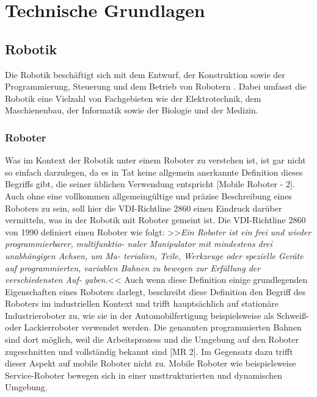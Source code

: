 \section{Technische Grundlagen}
\subsection{Robotik} %
\color{finishing}
Die Robotik beschäftigt sich mit dem Entwurf, der Konstruktion sowie der Programmierung, Steuerung und dem Betrieb 
von Robotern . Dabei umfasst die Robotik eine Vielzahl 
von Fachgebieten wie der Elektrotechnik, dem Maschienenbau, der Informatik sowie der Biologie und der Medizin.
\subsubsection{Roboter}
\color{finishing}
Was im Kontext der Robotik unter einem Roboter zu verstehen ist, ist gar nicht so einfach darzulegen, da es in Tat keine allgemein anerkannte Definition dieses Begriffs gibt, die seiner üblichen Verwendung entspricht [Mobile Roboter - 2].
\newline
Auch ohne eine vollkommen allgemeingültige und präzise Beschreibung eines Roboters zu sein, soll hier die VDI-Richtline 2860 einen Eindruck darüber vermitteln, was in der Robotik mit Roboter gemeint ist. \newline
Die VDI-Richtline 2860 von 1990 definiert einen Roboter wie folgt:
\vspace{2mm}
\newline
>>\textit{Ein Roboter ist ein frei und wieder programmierbarer, multifunktio-
naler Manipulator mit mindestens drei unabhängigen Achsen, um Ma-
terialien, Teile, Werkzeuge oder spezielle Geräte auf programmierten,
variablen Bahnen zu bewegen zur Erfüllung der verschiedensten Auf-
gaben.}<<
\vspace{2mm}
\newline
Auch wenn diese Definition einige grundlegenden Eigenschaften eines Roboters darlegt, beschreibt diese Definition den Begriff des Roboters im industriellen Kontext und trifft hauptsächlich auf stationäre Industrieroboter zu, wie sie in der Automobilfertigung beispielsweise als Schweiß- oder Lackierroboter  verwendet werden. Die genannten programmierten Bahnen sind dort möglich, weil die Arbeitsprozess und die Umgebung auf den Roboter zugeschnitten und vollständig bekannt sind [MR 2]. \newline
Im Gegensatz dazu trifft dieser Aspekt auf mobile Roboter nicht zu. Mobile Roboter wie beispielsweise Service-Roboter bewegen sich in einer unsttrukturierten und dynamischen Umgebung.

